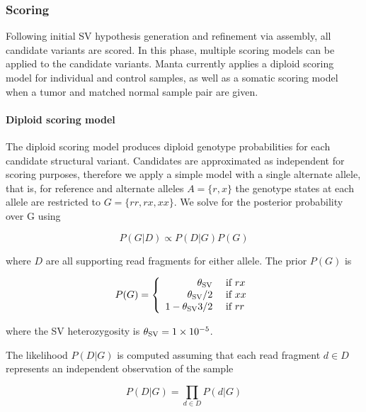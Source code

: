 \documentclass{article}
\newcommand{\e}[1]{\ensuremath{\times 10^{#1}}}
\begin{document}
\subsubsection{Scoring}

Following initial SV hypothesis generation and refinement via assembly, all candidate variants are scored. In this phase, multiple scoring models can be applied to the candidate variants. Manta currently applies a diploid scoring model for individual and control samples, as well as a somatic scoring model when a tumor and matched normal sample pair are given.

\paragraph{Diploid scoring model}

The diploid scoring model produces diploid genotype probabilities for each candidate structural variant. Candidates are approximated as independent for scoring purposes, therefore we apply a simple model with a single alternate allele, that is, for reference and alternate alleles $A = \{r,x\}$ the genotype states at each allele are restricted to $G = \{rr, rx, xx\}$. We solve for the posterior probability over G using

\begin{equation*}
P( G \vert D ) \propto P( D \vert G )  P (G) 
\end{equation*}

\noindent
where $D$ are all supporting read fragments for either allele. The prior $P(G)$ is

\newcommand{\thz}{\theta_{\textnormal{SV}}}

\begin{equation*}
P ( G ) =
\left\{
\begin{array}{rl}
\thz      & \mbox{ if $rx$} \\
\thz / 2  & \mbox{ if $xx$} \\
1 - \thz 3 / 2  & \mbox{ if $rr$}
\end{array}
\right.
\end{equation*}

\noindent
where the SV heterozygosity is $\thz = 1\e{-5}$.

The likelihood $P(D \vert G)$ is computed assuming that each read fragment $d \in D$ represents an independent observation of the sample

\begin{equation*}
P(D \vert G) = \prod_{d \in D} P(d \vert G)
\end{equation*}
\end{document}
